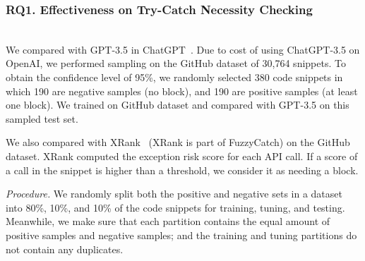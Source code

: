 \subsubsection{RQ1. Effectiveness on Try-Catch Necessity Checking}~\\
 We compared {\xblock} with
GPT-3.5 in ChatGPT~\cite{ChatGPT}. Due to cost of using ChatGPT-3.5 on
OpenAI, we performed sampling on the GitHub dataset of 30,764
snippets. To obtain the confidence level of 95\%, we randomly selected
380 code snippets in which 190 are negative samples
(no  block), and 190 are positive samples (at least
one  block). We trained on GitHub dataset and
compared with GPT-3.5 on this sampled test set.

We also compared {\xblock} with XRank~\cite{xrank-fse20} (XRank is
part of FuzzyCatch) on the GitHub dataset. XRank computed
the exception risk score for each API call. If a score of a call in
the snippet is higher than a threshold, we consider it as needing a
 block.

{\em Procedure.} We randomly split both the positive and negative sets
in a dataset into 80\%, 10\%, and 10\% of the code
snippets for training, tuning, and testing. Meanwhile, we make sure
that each partition contains the equal amount of positive samples and
negative samples; and the training and tuning partitions do not
contain any duplicates.

